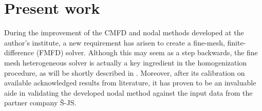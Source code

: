 
\section{Present work}

During the improvement of the CMFD and nodal methods developed at the author's institute, a new requirement has arisen
to create a fine-mesh, finite-difference (FMFD) solver. Although this may seem as a step backwards, the fine mesh
heterogeneous solver is actually a key ingredient in the homogenization procedure, as will be shortly described in
. Moreover, after its calibration on available acknowledged results from literature, it has
proven to be an invaluable aide in validating the developed nodal method against the input data from the partner company
{\v S}-JS.

